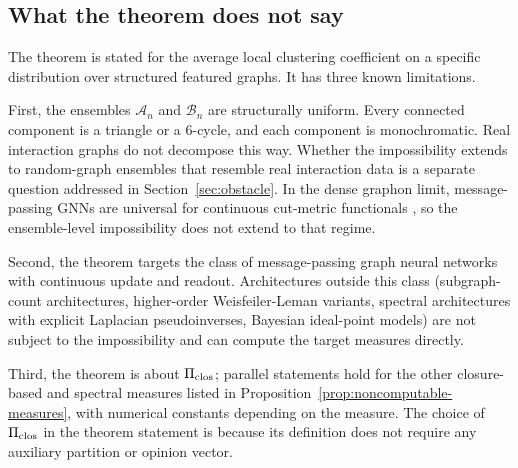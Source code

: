 \subsection{What the theorem does not say}

The theorem is stated for the average local clustering coefficient
on a specific distribution over structured featured graphs. It has
three known limitations.

First, the ensembles $\mathcal{A}_n$ and $\mathcal{B}_n$ are
structurally uniform. Every connected component is a triangle or a
$6$-cycle, and each component is monochromatic. Real interaction
graphs do not decompose this way. Whether the impossibility extends
to random-graph ensembles that resemble real interaction data is a
separate question addressed in Section~\ref{sec:obstacle}. In the dense
graphon limit, message-passing GNNs are universal for continuous
cut-metric functionals \citep{KerivenPeyre2020}, so the
ensemble-level impossibility does not extend to that regime.

Second, the theorem targets the class of message-passing graph
neural networks with continuous update and readout. Architectures
outside this class (subgraph-count architectures, higher-order
Weisfeiler-Leman variants, spectral architectures with explicit
Laplacian pseudoinverses, Bayesian ideal-point models) are not
subject to the impossibility and can compute the target measures
directly.

Third, the theorem is about $\Pi_{\mathrm{clos}}$; parallel statements hold
for the other closure-based and spectral measures listed in
Proposition~\ref{prop:noncomputable-measures}, with numerical constants
depending on the measure. The choice of $\Pi_{\mathrm{clos}}$ in the
theorem statement is because its definition does not require any
auxiliary partition or opinion vector.
